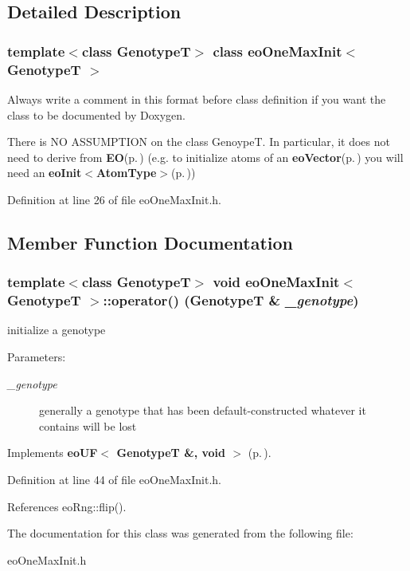 \subsection{Detailed Description}
\subsubsection*{template$<$class Genotype\-T$>$ class eo\-One\-Max\-Init$<$ Genotype\-T $>$}

Always write a comment in this format before class definition if you want the class to be documented by Doxygen. 

There is NO ASSUMPTION on the class Genoype\-T. In particular, it does not need to derive from {\bf EO}{\rm (p.\,\pageref{class_e_o})} (e.g. to initialize atoms of an {\bf eo\-Vector}{\rm (p.\,\pageref{classeo_vector})} you will need an {\bf eo\-Init$<$Atom\-Type$>$}{\rm (p.\,\pageref{classeo_init})}) 



Definition at line 26 of file eo\-One\-Max\-Init.h.

\subsection{Member Function Documentation}
\subsubsection{\setlength{\rightskip}{0pt plus 5cm}template$<$class Genotype\-T$>$ void {\bf eo\-One\-Max\-Init}$<$ Genotype\-T $>$::operator() (Genotype\-T \& {\em \_\-genotype})\hspace{0.3cm}{\tt  [inline, virtual]}}\label{classeo_one_max_init_a1}


initialize a genotype 

\begin{Desc}
\item[Parameters:]
\begin{description}
\item[{\em \_\-genotype}]generally a genotype that has been default-constructed whatever it contains will be lost \end{description}
\end{Desc}


Implements {\bf eo\-UF$<$ Genotype\-T \&, void $>$} {\rm (p.\,\pageref{classeo_u_f_a1})}.

Definition at line 44 of file eo\-One\-Max\-Init.h.

References eo\-Rng::flip().

The documentation for this class was generated from the following file:\begin{CompactItemize}
\item 
eo\-One\-Max\-Init.h\end{CompactItemize}
